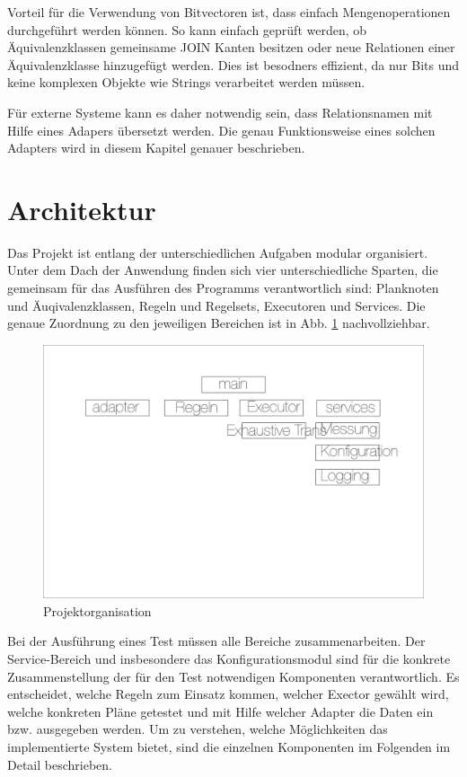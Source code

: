 Vorteil für die Verwendung von Bitvectoren ist, dass einfach Mengenoperationen durchgeführt werden können. So kann einfach geprüft werden, ob Äquivalenzklassen gemeinsame JOIN Kanten besitzen oder neue Relationen einer Äquivalenzklasse hinzugefügt werden. Dies ist besodners effizient, da nur Bits und keine komplexen Objekte wie Strings verarbeitet werden müssen.


Für externe Systeme kann es daher notwendig sein, dass Relationsnamen mit Hilfe eines Adapers übersetzt werden. Die genau Funktionsweise eines solchen Adapters wird in diesem Kapitel genauer beschrieben.


\section{Architektur}


Das Projekt ist entlang der unterschiedlichen Aufgaben modular organisiert. Unter dem Dach der Anwendung finden sich vier unterschiedliche Sparten, die gemeinsam für das Ausführen des Programms verantwortlich sind: Planknoten und Äuqivalenzklassen, Regeln und Regelsets, Executoren und Services. Die genaue Zuordnung zu den jeweiligen Bereichen ist in Abb. \ref{ProjectOrga} nachvollziehbar.


\begin{figure}[h]
  \centering
  \includegraphics[width=\textwidth]{04_Implementierung/Matrix.png}
  \caption{Projektorganisation}
  \label{ProjectOrga}
\end{figure}

Bei der Ausführung eines Test müssen alle Bereiche zusammenarbeiten. Der Service-Bereich und insbesondere das Konfigurationsmodul sind für die konkrete Zusammenstellung der für den Test notwendigen Komponenten verantwortlich. Es entscheidet, welche Regeln zum Einsatz kommen, welcher Exector gewählt wird, welche konkreten Pläne getestet und mit Hilfe welcher Adapter die Daten ein bzw. ausgegeben werden. Um zu verstehen, welche Möglichkeiten das implementierte System bietet, sind die einzelnen Komponenten im Folgenden im Detail beschrieben.



